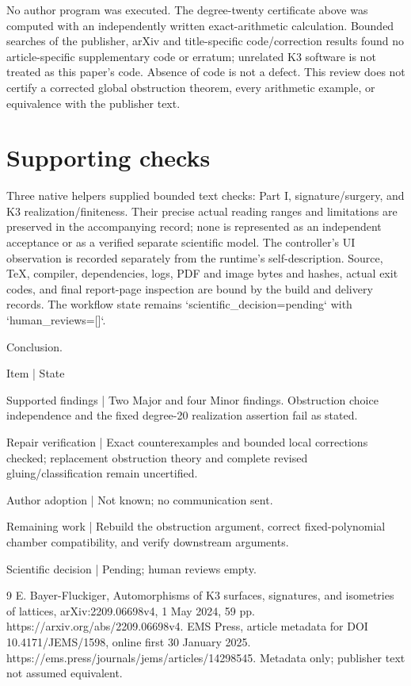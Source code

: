 \documentclass[10pt]{article}
\begin{document}
No author program was executed. The degree-twenty certificate above was computed with an independently written exact-arithmetic calculation. Bounded searches of the publisher, arXiv and title-specific code/correction results found no article-specific supplementary code or erratum; unrelated K3 software is not treated as this paper’s code. Absence of code is not a defect. This review does not certify a corrected global obstruction theorem, every arithmetic example, or equivalence with the publisher text.\par
\section*{Supporting checks}
Three native helpers supplied bounded text checks: Part I, signature/surgery, and K3 realization/finiteness. Their precise actual reading ranges and limitations are preserved in the accompanying record; none is represented as an independent acceptance or as a verified separate scientific model. The controller’s UI observation is recorded separately from the runtime’s self-description. Source, TeX, compiler, dependencies, logs, PDF and image bytes and hashes, actual exit codes, and final report-page inspection are bound by the build and delivery records. The workflow state remains `scientific\_decision=pending` with `human\_reviews=[]`.\par
Conclusion.\par
Item | State\par
Supported findings | Two Major and four Minor findings. Obstruction choice independence and the fixed degree-20 realization assertion fail as stated.\par
Repair verification | Exact counterexamples and bounded local corrections checked; replacement obstruction theory and complete revised gluing/classification remain uncertified.\par
Author adoption | Not known; no communication sent.\par
Remaining work | Rebuild the obstruction argument, correct fixed-polynomial chamber compatibility, and verify downstream arguments.\par
Scientific decision | Pending; human reviews empty.\par
9 E. Bayer-Fluckiger, Automorphisms of K3 surfaces, signatures, and isometries of lattices, arXiv:2209.06698v4, 1 May 2024, 59 pp. https://arxiv.org/abs/2209.06698v4. EMS Press, article metadata for DOI 10.4171/JEMS/1598, online first 30 January 2025. https://ems.press/journals/jems/articles/14298545. Metadata only; publisher text not assumed equivalent.\par
\end{document}

